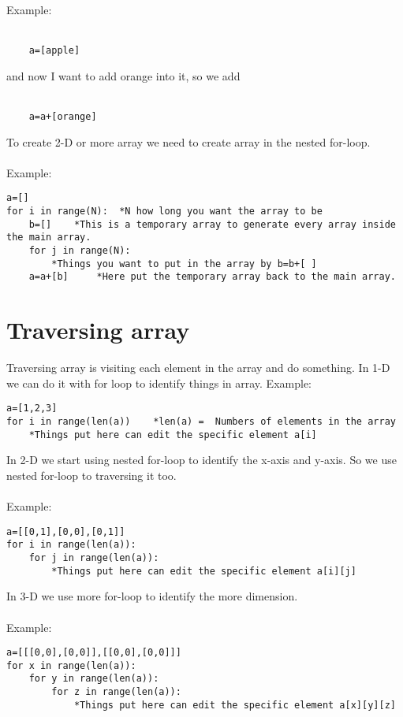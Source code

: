 \noindent Example:\\ \ \\

\begin{verbatim}	
    a=[apple]
\end{verbatim}

\noindent and now I want to add orange into it, so we add\\ \ \\

\begin{verbatim}
    a=a+[orange]
\end{verbatim}	

\noindent To create 2-D or more array we need to create array in the nested for-loop.\\ \ \\
\noindent Example:
\begin{verbatim}
a=[]
for i in range(N):	*N how long you want the array to be
    b=[]    *This is a temporary array to generate every array inside the main array.
    for j in range(N):
        *Things you want to put in the array by b=b+[ ]
    a=a+[b]	    *Here put the temporary array back to the main array.
\end{verbatim}		


\section{Traversing array}
Traversing array is visiting each element in the array and do something. In 1-D we can do it with for loop to identify things in array.
Example:

\begin{verbatim}
a=[1,2,3]
for i in range(len(a))    *len(a) =  Numbers of elements in the array
    *Things put here can edit the specific element a[i]
\end{verbatim}
	
\noindent In 2-D we start using nested for-loop to identify the x-axis and y-axis. So we use nested for-loop to traversing it too.\\ \ \\
\noindent Example:
\begin{verbatim}
a=[[0,1],[0,0],[0,1]]
for i in range(len(a)):
    for j in range(len(a)):
        *Things put here can edit the specific element a[i][j]
\end{verbatim}
			
\noindent In 3-D we use more for-loop to identify the more dimension.\\ \ \\
\noindent Example:
\begin{verbatim}
a=[[[0,0],[0,0]],[[0,0],[0,0]]]
for x in range(len(a)):
    for y in range(len(a)):
        for z in range(len(a)):
            *Things put here can edit the specific element a[x][y][z]
\end{verbatim}
	
	
	
	
	
	

